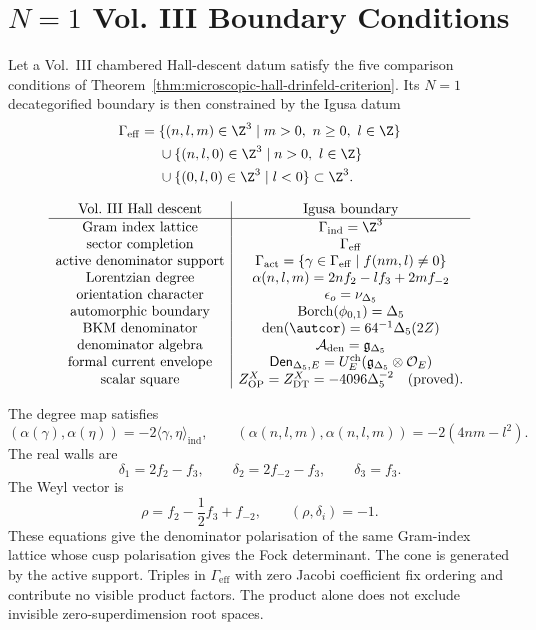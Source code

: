 \section{\texorpdfstring{$N=1$}{N=1} Vol. III Boundary Conditions}
\label{sec:vol3-homotopy-positive-cone}

Let a Vol.~III chambered Hall-descent datum satisfy the five comparison
conditions of Theorem~\ref{thm:microscopic-hall-drinfeld-criterion}.
Its \(N=1\) decategorified boundary is then constrained by the Igusa
datum
\[
\begin{aligned}
\Gamma_{\mathrm{eff}}
= {}&
\{(n,l,m)\in\Z^3\mid m>0,\ n\ge0,\ l\in\Z\}\\
&{}\cup\{(n,l,0)\in\Z^3\mid n>0,\ l\in\Z\}\\
&{}\cup\{(0,l,0)\in\Z^3\mid l<0\}
\subset \Z^3 .
\end{aligned}
\]

\[
\begin{array}{c|c}
\mathrm{Vol.\ III\ Hall\ descent} & \mathrm{Igusa\ boundary}\\ \hline
\mathrm{Gram\ index\ lattice} & \Gamma_{\mathrm{ind}}=\Z^3\\
\mathrm{sector\ completion} & \Gamma_{\mathrm{eff}}\\
\mathrm{active\ denominator\ support} &
\Gamma_{\mathrm{act}}=\{\gamma\in\Gamma_{\mathrm{eff}}\mid f(nm,l)\ne0\}\\
\mathrm{Lorentzian\ degree} &
\alpha(n,l,m)=2nf_2-lf_3+2mf_{-2}\\
\mathrm{orientation\ character} & \epsilon_o=\nu_{\Delta_5}\\
\mathrm{automorphic\ boundary} &
\operatorname{Borch}(\phi_{0,1})=\Delta_5\\
\mathrm{BKM\ denominator} &
\operatorname{den}(\autcor)=64^{-1}\Delta_5(2Z)\\
\mathrm{denominator\ algebra} &
\mathcal A_{\mathrm{den}}=\mathfrak g_{\Delta_5}\\
\mathrm{formal\ current\ envelope} &
\mathsf{Den}_{\Delta_5,E}
=U_E^{\mathrm{ch}}(\mathfrak g_{\Delta_5}\otimes\mathcal O_E)\\
\mathrm{scalar\ square} &
Z^X_{\mathrm{OP}}=Z^X_{\mathrm{DT}}=-4096\Delta_5^{-2}\quad(\mathrm{proved}).
\end{array}
\]

The degree map satisfies
\[
(\alpha(\gamma),\alpha(\eta))
=-2\langle\gamma,\eta\rangle_{\mathrm{ind}},
\qquad
(\alpha(n,l,m),\alpha(n,l,m))=-2(4nm-l^2).
\]
The real walls are
\[
\delta_1=2f_2-f_3,\qquad
\delta_2=2f_{-2}-f_3,\qquad
\delta_3=f_3.
\]
The Weyl vector is
\[
\rho=f_2-\frac12 f_3+f_{-2},\qquad
(\rho,\delta_i)=-1.
\]
These equations give the denominator polarisation of the same
Gram-index lattice whose cusp polarisation gives the Fock determinant.
The cone is generated by the active support.  Triples in
\(\Gamma_{\mathrm{eff}}\) with zero Jacobi coefficient fix ordering and
contribute no visible product factors.  The product alone does not
exclude invisible zero-superdimension root spaces.

